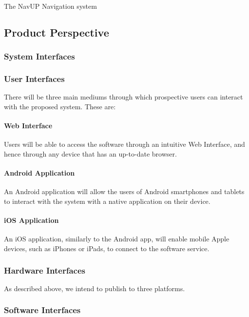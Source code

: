 \documentclass[10pt,a4paper]{article}
\begin{document}
		The NavUP Navigation system

		\subsection{Product Perspective}

			\subsubsection{System Interfaces}

			\subsubsection{User Interfaces}

				There will be three main mediums through which prospective users can
				interact with the proposed system. These are:

				\paragraph{Web Interface}

					Users will be able to access the software through an intuitive Web
					Interface, and hence through any device that has an up-to-date browser.

				\paragraph{Android Application}

					An Android application will allow the users of Android smartphones
					and tablets to interact with the system with a native application on
					their device.

				\paragraph{iOS Application}

					An iOS application, similarly to the Android app, will enable mobile
					Apple devices, such as iPhones or iPads, to connect to the software
					service.

			\subsubsection{Hardware Interfaces}

				As described above, we intend to publish to three platforms.

			\subsubsection{Software Interfaces}
\end{document}
